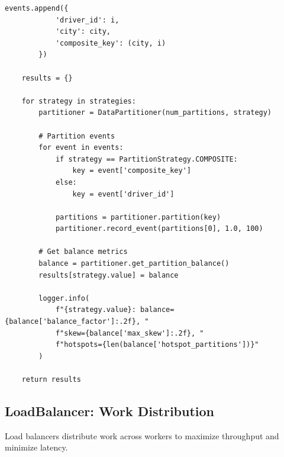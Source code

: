 \begin{lstlisting}[style=python, caption={Data Partitioning Strategies}]
        events.append({
            'driver_id': i,
            'city': city,
            'composite_key': (city, i)
        })

    results = {}

    for strategy in strategies:
        partitioner = DataPartitioner(num_partitions, strategy)

        # Partition events
        for event in events:
            if strategy == PartitionStrategy.COMPOSITE:
                key = event['composite_key']
            else:
                key = event['driver_id']

            partitions = partitioner.partition(key)
            partitioner.record_event(partitions[0], 1.0, 100)

        # Get balance metrics
        balance = partitioner.get_partition_balance()
        results[strategy.value] = balance

        logger.info(
            f"{strategy.value}: balance={balance['balance_factor']:.2f}, "
            f"skew={balance['max_skew']:.2f}, "
            f"hotspots={len(balance['hotspot_partitions'])}"
        )

    return results
\end{lstlisting}

\subsection{LoadBalancer: Work Distribution}

Load balancers distribute work across workers to maximize throughput and minimize latency.

